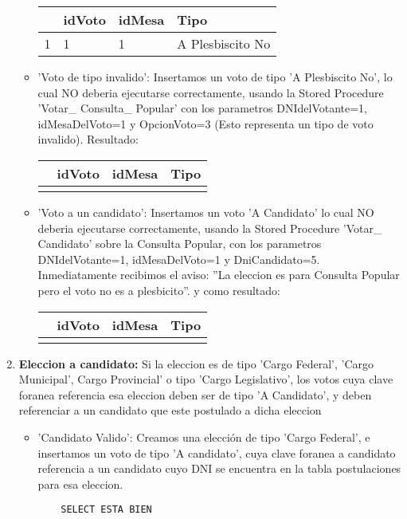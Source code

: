 \begin{enumerate}
\begin{itemize}
	\begin{tabular}{| l| l| l| l| }
	\hline 
	   & idVoto & idMesa & Tipo \\
	   \hline
	 1 & 1 & 1 & A Plesbiscito No \\
 	 \hline 
	\end{tabular}
	
	\vspace{2mm}	
	
	\item 'Voto de tipo invalido': Insertamos un voto de tipo 'A Plesbiscito No', lo cual NO deberia ejecutarse correctamente, usando la Stored Procedure 'Votar\_ Consulta\_ Popular' con los parametros DNIdelVotante=1, idMesaDelVoto=1 y OpcionVoto=3 (Esto representa un tipo de voto invalido). Resultado:
	
\begin{tabular}{| l| l| l| l| }
	\hline 
	   & idVoto & idMesa & Tipo \\
	   \hline
	 &  &  &  \\
 	 \hline 
	\end{tabular}
	
	\vspace{2mm}	
		
	
	\item 'Voto a un candidato': Insertamos un voto 'A Candidato' lo cual NO deberia ejecutarse correctamente, usando la Stored Procedure 'Votar\_ Candidato' sobre la Consulta Popular, con los parametros DNIdelVotante=1, idMesaDelVoto=1 y DniCandidato=5. Inmediatamente recibimos el aviso:
	''La eleccion es para Consulta Popular pero el voto no es a plesbicito''. y como resultado:
		
\begin{tabular}{| l| l| l| l| }
	\hline 
	   & idVoto & idMesa & Tipo \\
	   \hline
	 &  &  &  \\
 	 \hline 
	\end{tabular}
	
	\vspace{2mm}	
	\end{itemize}
\item \textbf{Eleccion a candidato:}  Si la eleccion es de tipo 'Cargo Federal', 'Cargo Municipal', Cargo Provincial' o tipo 'Cargo Legislativo', los votos cuya clave foranea referencia esa eleccion deben ser de tipo 'A Candidato', y deben referenciar a un candidato que este postulado a dicha eleccion

	\begin{itemize}
	\item 'Candidato Valido': Creamos una elección de tipo 'Cargo Federal', e insertamos un voto
	de tipo 'A candidato', cuya clave foranea a candidato referencia a un candidato cuyo DNI se encuentra en la tabla postulaciones para esa eleccion.
	\begin{lstlisting}
	SELECT ESTA BIEN
	\end{lstlisting}
	

\end{itemize}
\end{enumerate}
